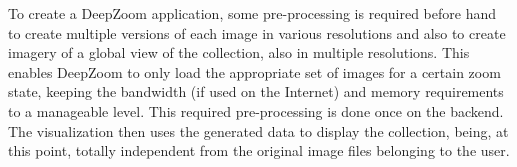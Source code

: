 To create a DeepZoom application, some pre-processing is required before hand to create multiple versions of each image in various resolutions and also to create imagery of a global view of the collection, also in multiple resolutions. This enables DeepZoom to only load the appropriate set of images for a certain zoom state, keeping the bandwidth (if used on the Internet) and memory requirements to a manageable level. This required pre-processing   is done once on the backend. The visualization then uses the generated data to display the collection, being, at this point, totally independent from the original image files belonging to the user.












